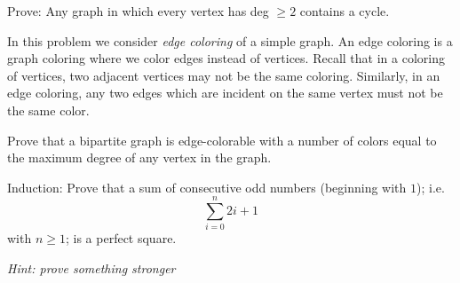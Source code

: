 \documentclass[12pt,oneside]{article}
\begin{document}
\begin{problem}{0}
\begin{problemparts}

\end{problemparts}
\end{problem}

\begin{problem}{0}
Prove:  Any graph in which every vertex has deg $\ge2$ contains a cycle.
\end{problem}

\begin{problem}{0}
In this problem we consider \emph{edge coloring} of a simple graph.  An edge coloring is a graph coloring where we color edges instead of vertices.  Recall that in a coloring of vertices, two adjacent vertices may not be the same coloring.  Similarly, in an edge coloring, any two edges which are incident on the same vertex must not be the same color. 

Prove that a bipartite graph is edge-colorable with a number of colors equal to the maximum degree of any vertex in the graph.
\end{problem}

\begin{problem}{0}
Induction: Prove that a sum of consecutive odd numbers (beginning with $1$); i.e. $$\sum_{i=0}^{n}2i+1$$ with $n \ge 1$; is a perfect square.

\emph{Hint: prove something stronger}
\end{problem}
\end{document}
